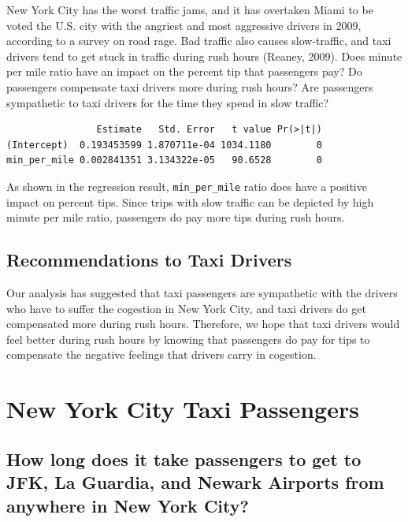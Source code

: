 \documentclass[12pt,twoside]{reedthesis}
\theoremstyle{definition}
\theoremstyle{definition}
\theoremstyle{definition}
\theoremstyle{remark}
\begin{document}
New York City has the worst traffic jams, and it has overtaken Miami to
be voted the U.S. city with the angriest and most aggressive drivers in
2009, according to a survey on road rage. Bad traffic also causes
slow-traffic, and taxi drivers tend to get stuck in traffic during rush
hours (Reaney, 2009). Does minute per mile ratio have an impact on the
percent tip that passengers pay? Do passengers compensate taxi drivers
more during rush hours? Are passengers sympathetic to taxi drivers for
the time they spend in slow traffic?
\begin{verbatim}
                Estimate   Std. Error   t value Pr(>|t|)
(Intercept)  0.193453599 1.870711e-04 1034.1180        0
min_per_mile 0.002841351 3.134322e-05   90.6528        0
\end{verbatim}
As shown in the regression result, \texttt{min\_per\_mile} ratio does
have a positive impact on percent tips. Since trips with slow traffic
can be depicted by high minute per mile ratio, passengers do pay more
tips during rush hours.

\section{Recommendations to Taxi
Drivers}\label{recommendations-to-taxi-drivers}

Our analysis has suggested that taxi passengers are sympathetic with the
drivers who have to suffer the cogestion in New York City, and taxi
drivers do get compensated more during rush hours. Therefore, we hope
that taxi drivers would feel better during rush hours by knowing that
passengers do pay for tips to compensate the negative feelings that
drivers carry in cogestion.

\chapter{New York City Taxi Passengers}\label{chapter4}

\section{How long does it take passengers to get to JFK, La Guardia, and
Newark Airports from anywhere in New York
City?}\label{how-long-does-it-take-passengers-to-get-to-jfk-la-guardia-and-newark-airports-from-anywhere-in-new-york-city}
\end{document}
